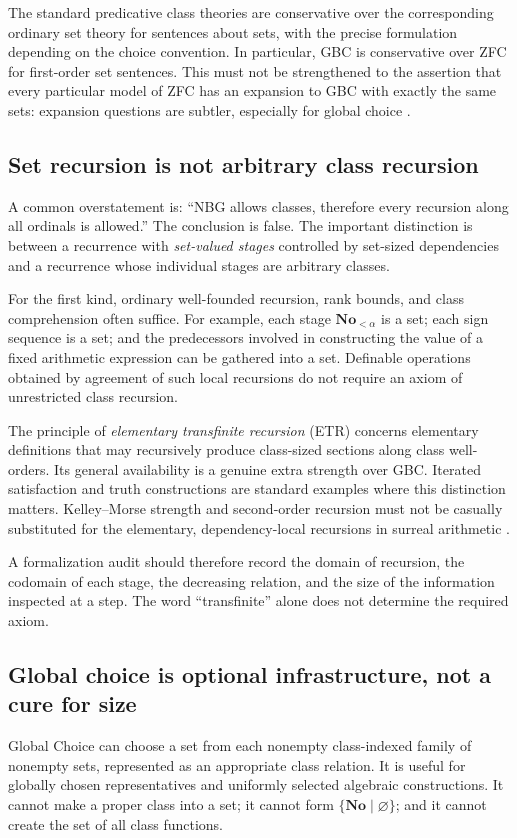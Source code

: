 \documentclass[11pt,letterpaper]{article}
\theoremstyle{definition}
\theoremstyle{remark}
\newcommand{\No}{\mathbf{No}}
\numberwithin{equation}{section}
\begin{document}
The standard predicative class theories are conservative over the corresponding ordinary set theory for sentences about sets, with the precise formulation depending on the choice convention. In particular, GBC is conservative over ZFC for first-order set sentences. This must not be strengthened to the assertion that every particular model of ZFC has an expansion to GBC with exactly the same sets: expansion questions are subtler, especially for global choice \cite{Williams,ShulmanSize}.

\subsection{Set recursion is not arbitrary class recursion}
A common overstatement is: ``NBG allows classes, therefore every recursion along all ordinals is allowed.'' The conclusion is false. The important distinction is between a recurrence with \emph{set-valued stages} controlled by set-sized dependencies and a recurrence whose individual stages are arbitrary classes.

For the first kind, ordinary well-founded recursion, rank bounds, and class comprehension often suffice. For example, each stage \(\No_{<\alpha}\) is a set; each sign sequence is a set; and the predecessors involved in constructing the value of a fixed arithmetic expression can be gathered into a set. Definable operations obtained by agreement of such local recursions do not require an axiom of unrestricted class recursion.

The principle of \emph{elementary transfinite recursion} (ETR) concerns elementary definitions that may recursively produce class-sized sections along class well-orders. Its general availability is a genuine extra strength over GBC. Iterated satisfaction and truth constructions are standard examples where this distinction matters. Kelley--Morse strength and second-order recursion must not be casually substituted for the elementary, dependency-local recursions in surreal arithmetic \cite{Williams,HamkinsETR}.

A formalization audit should therefore record the domain of recursion, the codomain of each stage, the decreasing relation, and the size of the information inspected at a step. The word ``transfinite'' alone does not determine the required axiom.

\subsection{Global choice is optional infrastructure, not a cure for size}
Global Choice can choose a set from each nonempty class-indexed family of nonempty sets, represented as an appropriate class relation. It is useful for globally chosen representatives and uniformly selected algebraic constructions. It cannot make a proper class into a set; it cannot form \(\{\No\mid\varnothing\}\); and it cannot create the set of all class functions.
\end{document}
